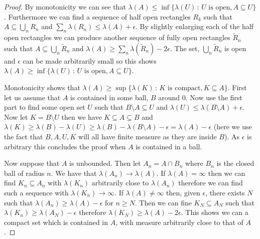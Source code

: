 \documentclass[11pt]{article}
\theoremstyle{definition}
\theoremstyle{remark}
\begin{document}
\begin{proof}
By monotonicity we can see that $\lambda(A) \leq \inf \{ \lambda(U)\,:\, \mbox{$U$ is open}, A \subseteq U\}$. Furthermore we can find a sequence of half open rectangles $R_k$ such that $A \subseteq \bigcup_n R_n$ and $\sum_n \lambda(R_n) \leq \lambda(A) + \epsilon$. By slightly enlarging each of the half open rectangles we can produce another sequence of fully open rectangles $\tilde{R}_n$ such that $A \subseteq \bigcup_n \tilde{R}_n$ and $\lambda(A) \geq \sum_n \lambda(\tilde{R}_n)-2\epsilon$. The set, $\bigcup_n \tilde{R}_n$ is open and $\epsilon$ can be made arbitrarily small so this shows $\lambda(A) \geq \inf \{ \lambda(U)\,:\, \mbox{$U$ is open}, A \subseteq U\}$.

Monotonicity shows that $\lambda(A) \geq \sup \{ \lambda(K)\,:\, \mbox{$K$ is compact}, K \subseteq A\}$. First let us assume that $A$ is contained in some ball, $B$ around 0. Now use the first part to find some open set $U$ such that $B \setminus A \subseteq U$ and $\lambda(U) \leq \lambda(B \setminus A) + \epsilon$. Now let $K = B \setminus U$ then we have $K \subseteq A \subseteq B$ and $\lambda(K) \geq \lambda(B) - \lambda(U) \geq \lambda(B) - \lambda(B \setminus A) - \epsilon = \lambda(A) - \epsilon$ (here we use the fact that $B, A, U, K$ will all have finite measure as they are inside $B$). As $\epsilon$ is arbitrary this concludes the proof when $A$ is contained in a ball. 

Now suppose that $A$ is unbounded. Then let $A_n = A \cap B_n$ where $B_n$ is the closed ball of radius $n$. We have that $\lambda(A_n) \rightarrow \lambda(A)$. If $\lambda(A) = \infty$ then we can find $K_n \subseteq A_n$ with $\lambda(K_n)$ arbitrarily close to $\lambda(A_n)$ therefore we can find such a sequence with $\lambda(K_n) \rightarrow \infty$. If $\lambda(A) \neq \infty$ then, given $\epsilon$, there exists $N$ such that $\lambda(A_n) \geq \lambda(A)-\epsilon$ for $n \geq N$. Then we can fine $K_N \subseteq A_N$ such that $\lambda(K_n) \geq \lambda(A_N) - \epsilon$ therefore $\lambda(K_N) \geq \lambda(A)- 2 \epsilon$. This shows we can a compact set which is contained in $A$, with measure arbitrarily close to that of $A$. 
\end{proof}
\end{document}
